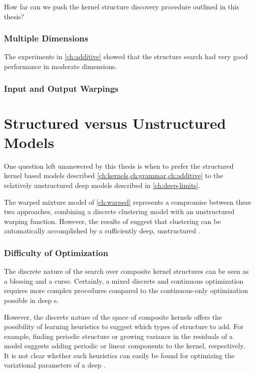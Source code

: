 How far can we push the kernel structure discovery procedure outlined in this thesis?

\subsubsection{Multiple Dimensions}

The experiments in \cref{ch:additive} showed that the structure search had very good performance in moderate dimensions.

\subsubsection{Input and Output Warpings}


\section{Structured versus Unstructured \sgp{} Models}

One question left unanswered by this thesis is when to prefer the structured kernel based models described \cref{ch:kernels,ch:grammar,ch:additive} to the relatively unstructured deep \gp{} models described in \cref{ch:deep-limits}.

The warped mixture model of \cref{ch:warped} represents a compromise between these two approaches, combining a discrete clustering model with an unstructured warping function.
However, the results of \citet{damianou2012deep} suggest that clustering can be automatically accomplished by a sufficiently deep, unstructured \gp{}.

\subsubsection{Difficulty of Optimization}
The discrete nature of the search over composite kernel structures can be seen as a blessing and a curse.
Certainly, a mixed discrete and continuous optimization requires more complex procedures compared to the continuous-only optimization possible in deep \gp{}s.

However, the discrete nature of the space of composite kernels offers the possibility of learning heuristics to suggest which types of structure to add.
For example, finding periodic structure or growing variance in the residuals of a model suggests adding periodic or linear components to the kernel, respectively.
It is not clear whether such heuristics can easily be found for optimizing the variational parameters of a deep \gp{}.

